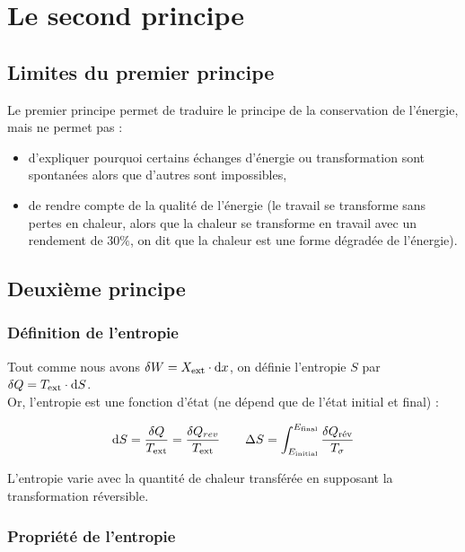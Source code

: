\documentclass[13pt, twoside, a4paper, french]{report}
\begin{document}
    \chapter{Le second principe}


        \section{Limites du premier principe}

            Le premier principe permet de traduire le principe de la conservation de l'énergie, mais ne permet pas :
            \begin{itemize}
                \item d'expliquer pourquoi certains échanges d'énergie ou transformation sont spontanées alors que d'autres sont impossibles,
                \item de rendre compte de la qualité de l'énergie (le travail se transforme sans pertes en chaleur, alors que la chaleur se transforme en travail avec un rendement de $30\%$, on dit que la chaleur est une forme dégradée de l'énergie).
            \end{itemize}


        \section{Deuxième principe}

            \subsection{Définition de l'entropie}

                Tout comme nous avons $\delta W = X_\textrm{ext} \cdot \textrm d x$, on définie l'entropie $S$ par $\delta Q = T_\textrm{ext} \cdot \textrm d S$.\\
                Or, l'entropie est une fonction d'état (ne dépend que de l'état initial et final) :

                \[\textrm d S = \dfrac{\delta Q}{T_\textrm{ext}} = \dfrac{\delta Q_{rev}}{T_\textrm{ext}} \qquad \Delta S = \int_{E_\textrm{initial}}^{E_\textrm{final}} \dfrac{\delta Q_\textrm{rév}}{T_\sigma}\]

                L'entropie varie avec la quantité de chaleur transférée en supposant la transformation réversible.

            \subsection{Propriété de l’entropie}
\end{document}
